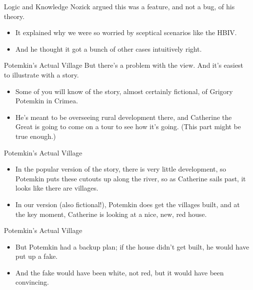 \documentclass[
  17pt,
  letterpaper,
  ignorenonframetext,
  aspectratio=169,
  handout]{beamer}
\providecommand{\tightlist}{%
  \setlength{\itemsep}{0pt}\setlength{\parskip}{0pt}}\usepackage{longtable,booktabs,array}
\begin{document}
\begin{frame}{Logic and Knowledge}
\protect\hypertarget{logic-and-knowledge}{}
Nozick argued this was a feature, and not a bug, of his theory.

\begin{itemize}[<+->]
\tightlist
\item
  It explained why we were so worried by sceptical scenarios like the
  HBIV.
\item
  And he thought it got a bunch of other cases intuitively right.
\end{itemize}
\end{frame}

\begin{frame}{Potemkin's Actual Village}
\protect\hypertarget{potemkins-actual-village}{}
But there's a problem with the view. And it's easiest to illustrate with
a story.

\begin{itemize}[<+->]
\tightlist
\item
  Some of you will know of the story, almost certainly fictional, of
  Grigory Potemkin in Crimea.
\item
  He's meant to be overseeing rural development there, and Catherine the
  Great is going to come on a tour to see how it's going. (This part
  might be true enough.)
\end{itemize}
\end{frame}

\begin{frame}{Potemkin's Actual Village}
\protect\hypertarget{potemkins-actual-village-1}{}
\begin{itemize}[<+->]
\tightlist
\item
  In the popular version of the story, there is very little development,
  so Potemkin puts these cutouts up along the river, so as Catherine
  sails past, it looks like there are villages.
\item
  In our version (also fictional!), Potemkin does get the villages
  built, and at the key moment, Catherine is looking at a nice, new, red
  house.
\end{itemize}
\end{frame}

\begin{frame}{Potemkin's Actual Village}
\protect\hypertarget{potemkins-actual-village-2}{}
\begin{itemize}[<+->]
\tightlist
\item
  But Potemkin had a backup plan; if the house didn't get built, he
  would have put up a fake.
\item
  And the fake would have been white, not red, but it would have been
  convincing.
\end{itemize}
\end{frame}
\end{document}
